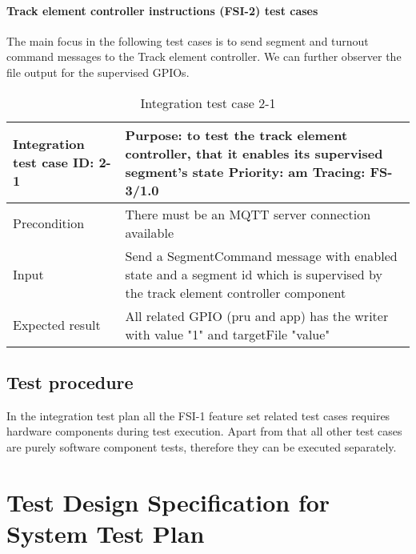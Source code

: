 \paragraph{Track element controller instructions (FSI-2) test cases}\label{p:TEC-ITC} The main focus in the following test cases is to send segment and turnout command messages to the Track element controller. We can further observer the file output for the supervised GPIOs.
\begin{table}[H]
	\caption{Integration test case 2-1}
	\label{table:TCase-FSI2-01}
	\begin{center}
		\renewcommand{\arraystretch}{1.8}
		\begin{tabu} 
			to 0.9 \textwidth
			{  X[0.3, l] X[l] }
			\toprule
			Integration test case ID: 2-1 & Purpose: to test the track element controller, that it enables its supervised segment's state \newline Priority: am \newline Tracing: FS-3/1.0 \\ \midrule
			Precondition                  & There must be an MQTT server connection available                                                                                              \\
			Input                         & Send a SegmentCommand message with enabled state and a segment id which is supervised by the track element controller component                \\
			Expected result               & All related GPIO (pru and app) has the writer with value "1" and targetFile "value"                                                            \\ \bottomrule
		\end{tabu}
	\end{center}
\end{table} 
\subsection{Test procedure} 
In the integration test plan all the FSI-1 feature set related test cases requires hardware components during test execution. Apart from that all other test cases are purely software component tests, therefore they can be executed separately.

\section{Test Design Specification for System Test Plan}

